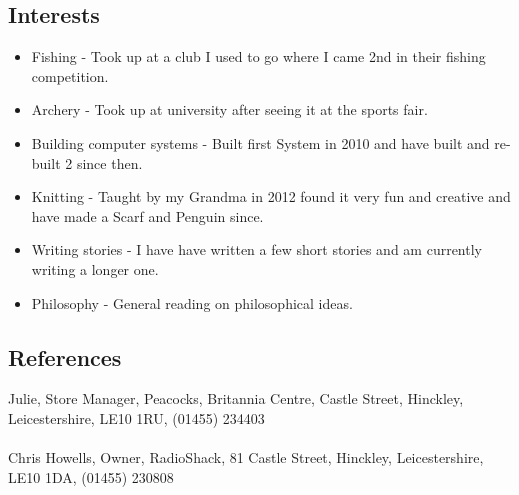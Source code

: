 \documentclass[0pt]{article}
\begin{document}
\subsection*{Interests}
\begin{itemize}
	\item Fishing - Took up at a club I used to go where I came 2nd in their fishing competition.
	\item Archery - Took up at university after seeing it at the sports fair.
	\item Building computer systems - Built first System in 2010 and have built and re-built 2 since then.
	\item Knitting - Taught by my Grandma in 2012 found it very fun and creative and have made a Scarf and Penguin since.
	\item Writing stories - I have have written a few short stories and am currently writing a longer one.
	\item Philosophy - General reading on philosophical ideas.
\end{itemize}

\subsection*{References}
Julie, Store Manager, Peacocks, Britannia Centre, Castle Street, Hinckley, Leicestershire, LE10 1RU, 
(01455) 234403
\\\\
Chris Howells, Owner, RadioShack, 81 Castle Street, Hinckley, Leicestershire, LE10 1DA,
(01455) 230808 
\end{document}
